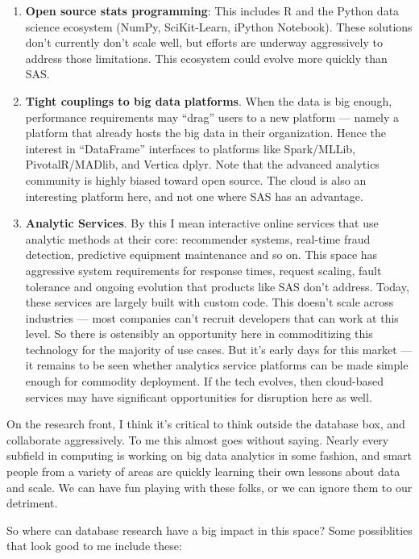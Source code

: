 \documentclass[b5paper,11pt,twoside,openright]{book}
\begin{document}
\begin{enumerate}
  \item
  {\textbf{Open source stats programming}}: This includes R and the
  Python data science ecosystem (NumPy, SciKit-Learn, iPython Notebook).
  These solutions don't currently don't scale well, but efforts are
  underway aggressively to address those limitations. This ecosystem
  could evolve more quickly than SAS.
  \item
  {\textbf{Tight couplings to big data platforms}}. When the data is big
  enough, performance requirements may ``drag'' users to a new platform
  --- namely a platform that already hosts the big data in their
  organization. Hence the interest in ``DataFrame'' interfaces to
  platforms like Spark/MLLib, PivotalR/MADlib, and Vertica dplyr. Note
  that the advanced analytics community is highly biased toward open
  source. The cloud is also an interesting platform here, and not one
  where SAS has an advantage.
  \item
  {\textbf{Analytic Services}}. By this I mean interactive online
  services that use analytic methods at their core: recommender systems,
  real-time fraud detection, predictive equipment maintenance and so on.
  This space has aggressive system requirements for response times,
  request scaling, fault tolerance and ongoing evolution that products
  like SAS don't address. Today, these services are largely built with
  custom code. This doesn't scale across industries --- most companies
  can't recruit developers that can work at this level. So there is
  ostensibly an opportunity here in commoditizing this technology for
  the majority of use cases. But it's early days for this market --- it
  remains to be seen whether analytics service platforms can be made
  simple enough for commodity deployment. If the tech evolves, then
  cloud-based services may have significant opportunities for disruption
  here as well.
\end{enumerate}

On the research front, I think it's critical to think outside the
database box, and collaborate aggressively. To me this almost goes
without saying. Nearly every subfield in computing is working on big
data analytics in some fashion, and smart people from a variety of areas
are quickly learning their own lessons about data and scale. We can have
fun playing with these folks, or we can ignore them to our detriment.

So where can database research have a big impact in this space? Some
possiblities that look good to me include these:
\end{document}
